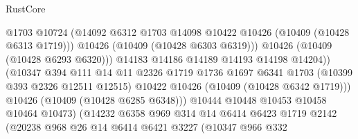\begin{lexlean}{RustCore}
\begin{coremodule}
                                        @1703
                                        @10724
                                        (@14092
                                          @6312
                                          @1703
                                          @14098
                                          @10422
                                          @10426
                                          (@10409 (@10428 @6313 @1719)))
                                        @10426
                                        (@10409 (@10428 @6303 @6319)))
                                      @10426
                                      (@10409 (@10428 @6293 @6320)))
                                    @14183
                                    @14186
                                    @14189
                                    @14193
                                    @14198
                                    @14204))
                                (@10347
                                  @394
                                  @111
                                  @14
                                  @11
                                  @2326
                                  @1719
                                  @1736
                                  @1697
                                  @6341
                                  @1703
                                  (@10399 @393 @2326 @12511 @12515)
                                  @10422
                                  @10426
                                  (@10409 (@10428 @6342 @1719)))
                                @10426
                                (@10409 (@10428 @6285 @6348)))
                              @10444
                              @10448
                              @10453
                              @10458
                              @10464
                              @10473)
                            (@14232
                              @6358
                              @969
                              @314
                              @14
                              @6414
                              @6423
                              @1719
                              @2142
                              (@20238
                                @968
                                @26
                                @14
                                @6414
                                @6421
                                @3227
                                (@10347
                                  @966
                                  @332

\end{coremodule}
\end{lexlean}

